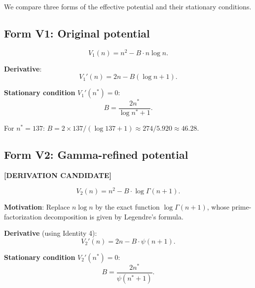 \documentclass[12pt,a4paper]{article}
\theoremstyle{definition}
\theoremstyle{remark}
\newcommand{\DERIVCAND}{\textcolor{orange!80!black}{\textbf{[DERIVATION CANDIDATE]}}}
\begin{document}
We compare three forms of the effective potential and their stationary conditions.

\subsection{Form V1: Original potential}
\label{sec:V1}

\begin{equation}
  V_1(n) = n^2 - B\cdot n\log n.
  \label{eq:V1}
\end{equation}

\textbf{Derivative}:
\begin{equation}
  V_1'(n) = 2n - B(\log n + 1).
  \label{eq:V1_deriv}
\end{equation}

\textbf{Stationary condition} $V_1'(n^*) = 0$:
\begin{equation}
  B = \frac{2n^*}{\log n^* + 1}.
  \label{eq:V1_stat}
\end{equation}

For $n^* = 137$: $B = 2\times137/(\log 137 + 1) \approx 274/5.920 \approx 46.28$.

\subsection{Form V2: Gamma-refined potential}
\label{sec:V2}

\DERIVCAND{}

\begin{equation}
  V_2(n) = n^2 - B\cdot\log\Gamma(n+1).
  \label{eq:V2}
\end{equation}

\textbf{Motivation}: Replace $n\log n$ by the exact function $\log\Gamma(n+1)$,
whose prime-factorization decomposition is given by Legendre's formula.

\textbf{Derivative} (using Identity 4):
\begin{equation}
  V_2'(n) = 2n - B\cdot\psi(n+1).
  \label{eq:V2_deriv}
\end{equation}

\textbf{Stationary condition} $V_2'(n^*) = 0$:
\begin{equation}
  B = \frac{2n^*}{\psi(n^*+1)}.
  \label{eq:V2_stat}
\end{equation}
\end{document}
